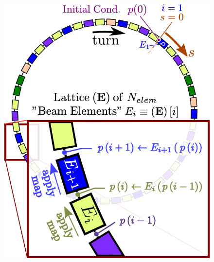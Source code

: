 \documentclass{beamer}
\begin{document}
\begin{frame}[t]
\begin{columns}
\begin{column}{0.35\textwidth}
{\begin{figure}[H]
        \includegraphics[width=\textwidth]{presentation_images/fig_tracking_algorithm_04}
    \end{figure}
}
\end{column}
\end{columns}
\end{frame}
\end{document}
